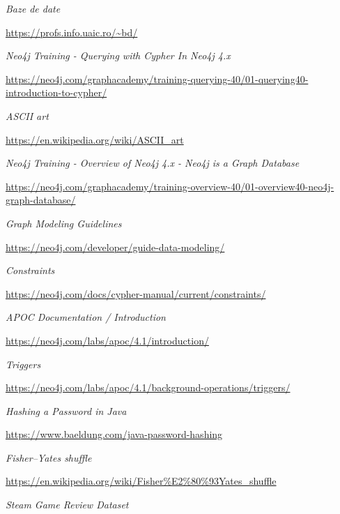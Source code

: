 \documentclass[12pt,a4paper]{report}
\begin{document}
\begin{thebibliography}{9}
  
  \textit{Baze de date}
  
  \url{https://profs.info.uaic.ro/~bd/}
  
  
  \textit{Neo4j Training - Querying with Cypher In Neo4j 4.x}
  
  \url{https://neo4j.com/graphacademy/training-querying-40/01-querying40-introduction-to-cypher/}
  
  
  \textit{ASCII art}
  
  \url{https://en.wikipedia.org/wiki/ASCII_art}
  
  
  \textit{Neo4j Training - Overview of Neo4j 4.x - Neo4j is a Graph Database  }
  
  \url{https://neo4j.com/graphacademy/training-overview-40/01-overview40-neo4j-graph-database/}
  
  
  \textit{Graph Modeling Guidelines}
  
  \url{https://neo4j.com/developer/guide-data-modeling/}
  
  
  \textit{Constraints}
  
  \url{https://neo4j.com/docs/cypher-manual/current/constraints/}
  
  
  \textit{APOC Documentation / Introduction}
  
  \url{https://neo4j.com/labs/apoc/4.1/introduction/}
  
  
  \textit{Triggers}
  
  \url{https://neo4j.com/labs/apoc/4.1/background-operations/triggers/}
  
  
  \textit{Hashing a Password in Java}
  
  \url{https://www.baeldung.com/java-password-hashing}
  
  
  \textit{Fisher–Yates shuffle}
  
  \url{https://en.wikipedia.org/wiki/Fisher%E2%80%93Yates_shuffle}
  
  
  \textit{Steam Game Review Dataset}
  

\end{thebibliography}
\end{document}
